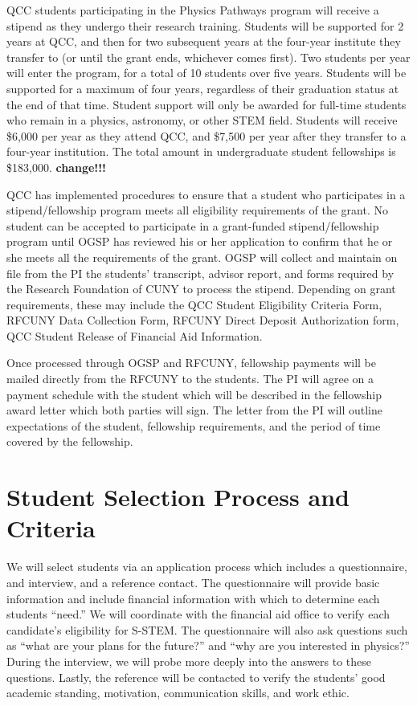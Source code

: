 \documentclass[12pt]{article}
\begin{document}
QCC students participating in the Physics Pathways program will receive a stipend as they undergo their research training. Students will be supported for 2 years at QCC, and then for two subsequent years at the four-year institute they transfer to (or until the grant ends, whichever comes first). Two students per year will enter the program, for a total of 10 students over five years. Students will be supported for a maximum of four years, regardless of their graduation status at the end of that time. Student support will only be awarded for full-time students who remain in a physics, astronomy, or other STEM field. Students will receive \$6,000 per year as they attend QCC, and \$7,500 per year after they transfer to a four-year institution. The total amount in undergraduate student fellowships is \$183,000.  {\bf change!!!}


QCC has implemented procedures to ensure that a student who participates in a stipend/fellowship program meets all eligibility requirements of the grant.  No student can be accepted to participate in a grant-funded stipend/fellowship program until OGSP has reviewed his or her application to confirm that he or she meets all the requirements of the grant.  OGSP will collect and maintain on file from the PI the students' transcript, advisor report, and forms required by the Research Foundation of CUNY to process the stipend.  Depending on grant requirements, these may include the QCC Student Eligibility Criteria Form, RFCUNY Data Collection Form, RFCUNY Direct Deposit Authorization form, QCC Student Release of Financial Aid Information.  
 
Once processed through OGSP and RFCUNY, fellowship payments will be mailed directly from the RFCUNY to the students.  The PI will agree on a payment schedule with the student which will be described in the fellowship award letter which both parties will sign.  The letter from the PI will outline expectations of the student, fellowship requirements, and the period of time covered by the fellowship. 


\section{Student Selection Process and Criteria}
We will select students via an application process which includes a questionnaire, and interview, and a reference contact.  The questionnaire will provide basic information and include financial information with which to determine each students ``need.''  We will coordinate with the financial aid office to verify each candidate's eligibility for S-STEM.  The questionnaire will also ask questions such as ``what are your plans for the future?'' and ``why are you interested in physics?''  During the interview, we will probe more deeply into the answers to these questions.  Lastly, the reference will be contacted to verify the students' good academic standing, motivation, communication skills, and work ethic.
\end{document}
